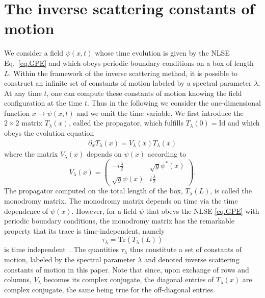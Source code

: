 \documentclass[submission,Phys,10pt]{SciPost}%
\begin{document}
 \section{The inverse scattering constants of motion }
\label{sec:ISM}
We consider a field $\psi(x,t)$ whose time evolution is given by  the NLSE Eq.~\eqref{eq.GPE} and  
which obeys periodic boundary conditions on a box of length $L$.
Within the framework of the inverse scattering method, it is possible to construct an infinite set of constants of motion labeled by a spectral parameter $\lambda$. 
At any time $t$, one can compute these constants of motion  knowing the field configuration  at the time $t$. Thus in the following we consider  the  one-dimensional function $x\rightarrow \psi(x,t)$ and we omit the time variable.
We first introduce the $2\times 2$ matrix $T_{\lambda}(x)$, called the propagator, which fulfills $T_{\lambda}(0)=\mathrm{Id}$ and which obeys the evolution equation 
\begin{eqnarray}
    \partial_{x}T_{\lambda}(x)=V_{\lambda}(x)T_{\lambda}(x)
    \label{eq:evoleq}
    \end{eqnarray}
where the matrix $V_{\lambda}(x)$ depends on $\psi(x)$ according to
\begin{equation}
    V_{\lambda}(x)=
    \begin{pmatrix} 
    -i\frac{\lambda}{2} & \sqrt{g}\psi^*(x)\\
     \sqrt{g}\psi(x)& i\frac{\lambda}{2}
    \end{pmatrix}.
    \label{eq:U}
\end{equation}
The propagator computed on the total length of the box, $T_\lambda(L)$, is called the monodromy matrix. The monodromy matrix depends on time via the time dependence of $\psi(x)$. However, for a field $\psi$ that obeys the NLSE \eqref{eq.GPE} with periodic boundary conditions, the monodromy matrix has the  remarkable property that its trace is time-independent, namely
\begin{equation}
    \tau_\lambda=\mathrm{Tr}(T_\lambda(L))
    \label{eq:tau}
\end{equation} is time independent~\cite{korepin_quantum_1993}. The quantities $\tau_\lambda$ thus constitute a set of constants of motion, labeled by the spectral parameter $\lambda$ and denoted inverse scattering constants of motion in this paper. Note that since, upon exchange of rows and columns, $V_\lambda$ becomes its complex conjugate, the diagonal entries of $T_\lambda (x)$ are complex conjugate, the same being true for the off-diagonal entries.
\end{document}
